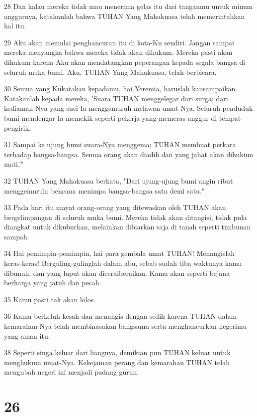 \par 28 Dan kalau mereka tidak mau menerima gelas itu dari tanganmu untuk minum anggurnya, katakanlah bahwa TUHAN Yang Mahakuasa telah memerintahkan hal itu.
\par 29 Aku akan memulai penghancuran itu di kota-Ku sendiri. Jangan sampai mereka menyangka bahwa mereka tidak akan dihukum. Mereka pasti akan dihukum karena Aku akan mendatangkan peperangan kepada segala bangsa di seluruh muka bumi. Aku, TUHAN Yang Mahakuasa, telah berbicara.
\par 30 Semua yang Kukatakan kepadamu, hai Yeremia, haruslah kausampaikan. Katakanlah kepada mereka, 'Suara TUHAN menggelegar dari surga; dari kediaman-Nya yang suci Ia menggemuruh melawan umat-Nya. Seluruh penduduk bumi mendengar Ia memekik seperti pekerja yang memeras anggur di tempat pengirik.
\par 31 Sampai ke ujung bumi suara-Nya menggema; TUHAN membuat perkara terhadap bangsa-bangsa. Semua orang akan diadili dan yang jahat akan dihukum mati.'"
\par 32 TUHAN Yang Mahakuasa berkata, "Dari ujung-ujung bumi angin ribut menggemuruh; bencana menimpa bangsa-bangsa satu demi satu."
\par 33 Pada hari itu mayat orang-orang yang ditewaskan oleh TUHAN akan bergelimpangan di seluruh muka bumi. Mereka tidak akan ditangisi, tidak pula diangkat untuk dikuburkan, melainkan dibiarkan saja di tanah seperti timbunan sampah.
\par 34 Hai pemimpin-pemimpin, hai para gembala umat TUHAN! Menangislah keras-keras! Berguling-gulinglah dalam abu, sebab sudah tiba waktunya kamu dibunuh, dan yang luput akan diceraiberaikan. Kamu akan seperti bejana berharga yang jatuh dan pecah.
\par 35 Kamu pasti tak akan lolos.
\par 36 Kamu berkeluh kesah dan menangis dengan sedih karena TUHAN dalam kemarahan-Nya telah membinasakan bangsamu serta menghancurkan negerimu yang aman itu.
\par 38 Seperti singa keluar dari liangnya, demikian pun TUHAN keluar untuk menghukum umat-Nya. Kekejaman perang dan kemarahan TUHAN telah mengubah negeri ini menjadi padang gurun.

\chapter{26}

